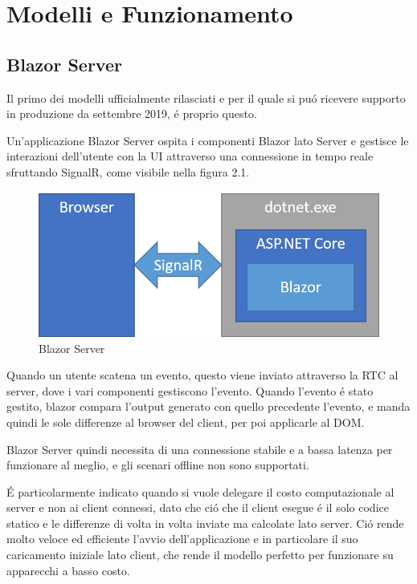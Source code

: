 \chapter{Modelli e Funzionamento}\label{cap:modefunz}
\section{Blazor Server}\label{sez:bserver}
Il primo dei modelli ufficialmente rilasciati e per il quale si pu\'o ricevere supporto in produzione da settembre 2019\cite{blazorServerRelease}, \'e proprio questo.

Un'applicazione Blazor Server ospita i componenti Blazor lato Server e gestisce le interazioni dell'utente con la UI attraverso una connessione in tempo reale sfruttando SignalR, come visibile nella figura 2.1.

\begin{figure}[H]
	\centerline{\includegraphics[scale=0.6]{figure/blazor-server.png}}
	\caption{Blazor Server}
	\label{fig:BlazorServer}
\end{figure}

Quando un utente scatena un evento, questo viene inviato attraverso la RTC al server, dove i vari componenti gestiscono l'evento.
Quando l'evento \'e stato gestito, blazor compara l'output generato con quello precedente l'evento, e manda quindi le sole differenze al browser del client, per poi applicarle al DOM.\cite{blazorModelsScenarios}

Blazor Server quindi necessita di una connessione stabile e a bassa latenza per funzionare al meglio, e gli scenari offline non sono supportati.

\'E particolarmente indicato quando si vuole delegare il costo computazionale al server e non ai client connessi, dato che ci\'o che il client esegue \'e il solo codice statico e le differenze di volta in volta inviate ma calcolate lato server.
Ci\'o rende molto veloce ed efficiente l'avvio dell'applicazione e in particolare il suo caricamento iniziale lato client, che rende il modello perfetto per funzionare su apparecchi a basso costo.
\pagebreak

